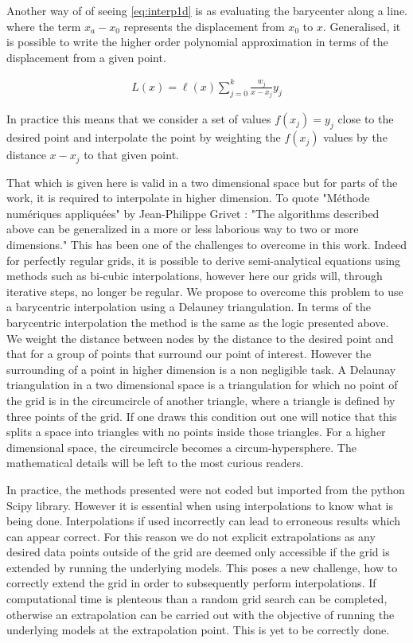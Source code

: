 Another way of of seeing \cref{eq:interp1d} is as evaluating the barycenter along a line. where the term $x_a-x_0$ represents the displacement from $x_0$ to $x$. Generalised, it is possible to write the higher order polynomial approximation in terms of the displacement from a given point.

\begin{align} 
    L(x) = \ell(x) \sum_{j=0}^k \frac{w_j}{x-x_j}y_j
\end{align}

In practice this means that we consider a set of values $f(x_j)=y_j$ close to the desired point and interpolate the point by weighting the $f(x_j)$ values by the distance $x-x_j$ to that given point.

That which is given here is valid in a two dimensional space but for parts of the work, it is required to interpolate in higher dimension. To quote "Méthode numériques appliquées" by Jean-Philippe Grivet \parencite{Methodes_numerique_appliques} : "The algorithms described above can be generalized in a more or less laborious way to two or more dimensions." This has been one of the challenges to overcome in this work. Indeed for perfectly regular grids, it is possible to derive semi-analytical equations using methods such as bi-cubic interpolations, however here our grids will, through iterative steps, no longer be regular. We propose to overcome this problem to use a barycentric interpolation using a Delauney triangulation. In terms of the barycentric interpolation the method is the same as the logic presented above. We weight the distance between nodes by the distance to the desired point and that for a group of points that surround our point of interest. However the surrounding of a point in higher dimension is a non negligible task. A Delaunay triangulation in a two dimensional space is a triangulation for which no point of the grid is in the circumcircle of another triangle, where a triangle is defined by three points of the grid. If one draws this condition out one will notice that this splits a space into triangles with no points inside those triangles. For a higher dimensional space, the circumcircle becomes a circum-hypersphere. The mathematical details will be left to the most curious readers.\par

In practice, the methods presented were not coded but imported from the python Scipy library. However it is essential when using interpolations to know what is being done. Interpolations if used incorrectly can lead to erroneous results which can appear correct. For this reason we do not explicit extrapolations as any desired data points outside of the grid are deemed only accessible if the grid is extended by running the underlying models. This poses a new challenge, how to correctly extend the grid in order to subsequently perform interpolations. If computational time is plenteous than a random grid search can be completed, otherwise an extrapolation can be carried out with the objective of running the underlying models at the extrapolation point. This is yet to be correctly done.

